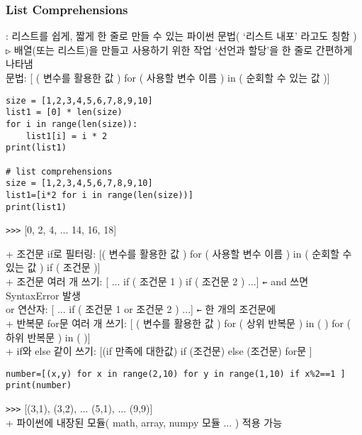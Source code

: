 \documentclass[11pt,a4paper]{article}
\begin{document}
\subsubsection{\Large\textbf{List Comprehensions}}
\begin{spacing}{1.5}
: 리스트를 쉽게, 짧게 한 줄로 만들 수 있는 파이썬 문법( `리스트 내포' 라고도 칭함 )\\
\texttt{▷} 배열(또는 리스트)을 만들고 사용하기 위한 작업 `선언과 할당'을 한 줄로 간편하게 나타냄\\
\hspace*{2em}문법: [ ( 변수를 활용한 값 ) for ( 사용할 변수 이름 ) in ( 순회할 수 있는 값 )]
\end{spacing}
\begin{lstlisting}[label={list:first},caption=List Comprehensions]
size = [1,2,3,4,5,6,7,8,9,10]
list1 = [0] * len(size)
for i in range(len(size)):
    list1[i] = i * 2
print(list1)

# list comprehensions
size = [1,2,3,4,5,6,7,8,9,10]
list1=[i*2 for i in range(len(size))]
print(list1)
\end{lstlisting}
\texttt{>>>} [0, 2, 4, ... 14, 16, 18]\\
\begin{spacing}{1.5}
+ 조건문 if로 필터링: [( 변수를 활용한 값 ) for ( 사용할 변수 이름 ) in ( 순회할 수 있는 값 ) if ( 조건문 )]\\
+ 조건문 여러 개 쓰기: [ ... if ( 조건문 1 ) if ( 조건문 2 ) ...] \texttt{←} and 쓰면 SyntaxError 발생\\
\hspace*{5em} or 연산자: [ ... if ( 조건문 1 or 조건문 2 ) ...] \texttt{←} 한 개의 조건문에\\
+ 반복문 for문 여러 개 쓰기: [ ( 변수를 활용한 값 ) for ( 상위 반복문 ) in ( ) for ( 하위 반복문 ) in ( )]\\
+ if와 else 같이 쓰기: [(if 만족에 대한값) if (조건문) else (조건문) for문 ]
\end{spacing}

\begin{lstlisting}[label={list:first},caption=List Comprehensions]
number=[(x,y) for x in range(2,10) for y in range(1,10) if x%2==1 ]
print(number)
\end{lstlisting}
\texttt{>>>} [(3,1), (3,2), ... (5,1), ... (9,9)]\\

+ 파이썬에 내장된 모듈( math, array, numpy 모듈 ... ) 적용 가능\\
\end{document}

